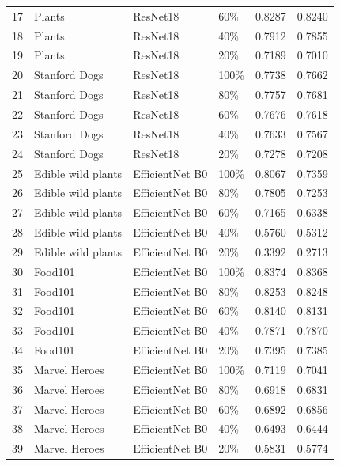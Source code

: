 \begin{longtable}{|l|l|l|l|r|r|}
17 &     Plants &      ResNet18 &        60\% &  0.8287 &  0.8240 \\
18 &     Plants &      ResNet18 &        40\% &  0.7912 &  0.7855 \\
19 &     Plants &      ResNet18 &        20\% &  0.7189 &  0.7010 \\\hline
20 &  Stanford Dogs &      ResNet18 &       100\% &  0.7738 &  0.7662 \\
21 &  Stanford Dogs &      ResNet18 &        80\% &  0.7757 &  0.7681 \\
22 &  Stanford Dogs &      ResNet18 &        60\% &  0.7676 &  0.7618 \\
23 &  Stanford Dogs &      ResNet18 &        40\% &  0.7633 &  0.7567 \\
24 &  Stanford Dogs &      ResNet18 &        20\% &  0.7278 &  0.7208 \\\hline
25 &  Edible wild plants &  EfficientNet B0 &       100\% &  0.8067 &  0.7359 \\
26 &  Edible wild plants &  EfficientNet B0 &        80\% &  0.7805 &  0.7253 \\
27 &  Edible wild plants &  EfficientNet B0 &        60\% &  0.7165 &  0.6338 \\
28 &  Edible wild plants &  EfficientNet B0 &        40\% &  0.5760 &  0.5312 \\
29 &  Edible wild plants &  EfficientNet B0 &        20\% &  0.3392 &  0.2713 \\\hline
30 &        Food101 &  EfficientNet B0 &       100\% &  0.8374 &  0.8368 \\
31 &        Food101 &  EfficientNet B0 &        80\% &  0.8253 &  0.8248 \\
32 &        Food101 &  EfficientNet B0 &        60\% &  0.8140 &  0.8131 \\
33 &        Food101 &  EfficientNet B0 &        40\% &  0.7871 &  0.7870 \\
34 &        Food101 &  EfficientNet B0 &        20\% &  0.7395 &  0.7385 \\\hline
35 &         Marvel Heroes &  EfficientNet B0 &       100\% &  0.7119 &  0.7041 \\
36 &         Marvel Heroes &  EfficientNet B0 &        80\% &  0.6918 &  0.6831 \\
37 &         Marvel Heroes &  EfficientNet B0 &        60\% &  0.6892 &  0.6856 \\
38 &         Marvel Heroes &  EfficientNet B0 &        40\% &  0.6493 &  0.6444 \\
39 &         Marvel Heroes &  EfficientNet B0 &        20\% &  0.5831 &  0.5774 \\\hline

\end{longtable}
